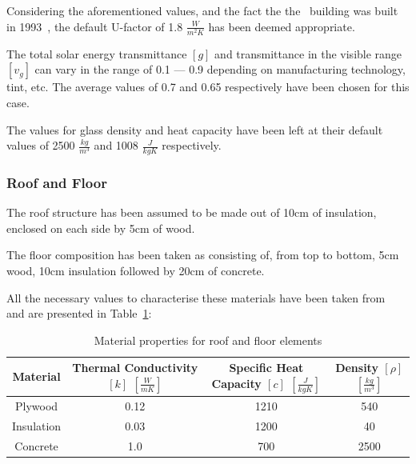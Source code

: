 Considering the aforementioned values, and the fact the the \pdome\ building was
built in 1993~\cite{nattererModelingMultilayerBeam2008}, the default U-factor of
1.8 \(\frac{W}{m^2K}\) has been deemed appropriate.

The total solar energy transmittance $[g]$ and transmittance in the visible
range $[v_g]$ can vary in the range of 0.1 --- 0.9 depending on manufacturing
technology, tint, etc. The average values of 0.7 and 0.65 respectively have been
chosen for this case.

The values for glass density and heat capacity have been left at their default
values of 2500 \(\frac{kg}{m^3}\) and 1008 \(\frac{J}{kgK}\) respectively.

\subsubsection{Roof and Floor}


The roof structure has been assumed to be made out of 10cm of insulation,
enclosed on each side by 5cm of wood.


The floor composition has been taken as consisting of, from top to bottom, 5cm
wood, 10cm insulation followed by 20cm of concrete. 

All the necessary values to characterise these materials have been taken
from~\cite{BuildingsHeatTransferData} and are presented in
Table~\ref{tab:material_properties}: 

\begin{table}[ht]
\centering
    \begin{tabular}{||c c c c||}
        \hline
        Material & Thermal Conductivity $[k]$ $[\frac{W}{mK}]$ & Specific Heat
        Capacity $[c]$ $[\frac{J}{kgK}]$ & Density $[\rho]$ $[\frac{kg}{m^3}]$
        \\
        \hline \hline
        Plywood & 0.12 & 1210 & 540 \\
        Insulation & 0.03 & 1200 & 40 \\
        Concrete & 1.0 & 700 & 2500 \\
        \hline
    \end{tabular}
    \caption{Material properties for roof and floor elements}
\label{tab:material_properties}
\end{table}

